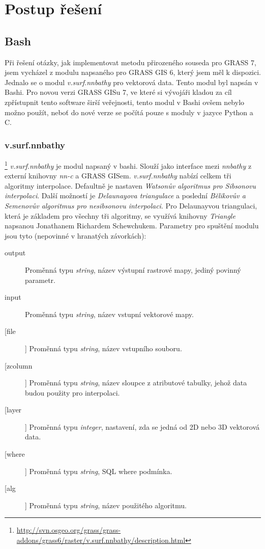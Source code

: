 \documentclass[12pt,a4paper]{article}
\begin{document}
\newpage
\section{Postup řešení}
\subsection{Bash}
Při řešení otázky, jak implementovat metodu přirozeného souseda pro GRASS 7, jsem vycházel z modulu napsaného pro GRASS GIS 6, který jsem měl k dispozici. Jednalo se o modul \textit{v.surf.nnbathy} pro vektorová data. Tento modul byl napsán v Bashi. Pro novou verzi GRASS GISu 7, ve které si vývojáři kladou za cíl zpřístupnit tento software širší veřejnosti, tento modul v Bashi ovšem nebylo možno použít, neboť do nové verze se počítá pouze s moduly v jazyce Python a C.

\subsubsection{v.surf.nnbathy}\footnote{\url{http://svn.osgeo.org/grass/grass-addons/grass6/raster/v.surf.nnbathy/description.html}}
\textit{v.surf.nnbathy} je modul napsaný v bashi. Slouží jako interface mezi \textit{nnbathy} z externí knihovny \textit{nn-c} a GRASS GISem. \textit{v.surf.nnbathy} nabízí celkem tři algoritmy interpolace. Defaultně je nastaven \textit{Watsonův algoritmus 	pro Sibsonovu interpolaci}. Další možností je \textit{Delaunayova triangulace} a poslední \textit{Bělikovův a Semenovův algoritmus pro nesibsonovu interpolaci}. Pro Delaunayvou triangulaci, která je základem pro všechny tři algoritmy, se využívá knihovny \textit{Triangle} napsanou Jonathanem Richardem Schewchukem. Parametry pro spuštění modulu jsou tyto (nepovinné v hranatých závorkách):
\begin{description}
\item[output] Proměnná typu \textit{string}, název výstupní rastrové mapy, jediný povinný parametr.
\item[input] Proměnná typu \textit{string}, název vstupní vektorové mapy.
\item[[file]] Proměnná typu \textit{string}, název vstupního souboru.
\item[[zcolumn]] Proměnná typu \textit{string}, název sloupce z atributové tabulky, jehož data budou použity pro interpolaci.
\item[[layer]] Proměnná typu \textit{integer}, nastavení, zda se jedná od 2D nebo 3D vektorová data.
\item[[where]] Proměnná typu \textit{string}, SQL where podmínka.
\item[[alg]] Proměnná typu \textit{string}, název použitého algoritmu.
\end{description}
\end{document}
